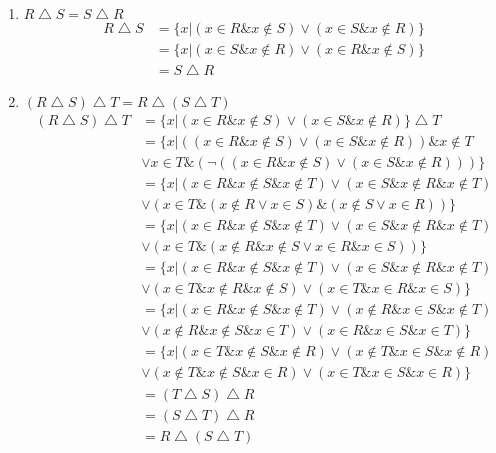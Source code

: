 \documentclass[12pt]{article}
\theoremstyle{neosn}
\begin{document}
    \begin{enumerate}
        \item $R \bigtriangleup S = S \bigtriangleup R$\\
            \begin{align*}
                R \bigtriangleup S &= \{x|(x\in R \& x \notin S) \lor (x\in S \& x\notin R)\}\\
                                    &= \{x|(x\in S \& x\notin R) \lor (x\in R \& x \notin S)\}\\
                                    & = S \bigtriangleup R
            \end{align*}

        \item $(R \bigtriangleup S) \bigtriangleup T = R \bigtriangleup (S \bigtriangleup T)$\\
            \begin{align*}
                (R \bigtriangleup S) \bigtriangleup T &= \{x|(x\in R \& x \notin S) \lor (x\in S \& x\notin R)\} \bigtriangleup T\\
                    &= \{x|((x\in R \& x \notin S) \lor (x\in S \& x\notin R)) \& x \notin T \\
                    &\lor x \in T \& (\lnot ((x\in R \& x \notin S) \lor (x\in S \& x\notin R))) \}\\
                    &= \{x|(x\in R \& x \notin S \& x\notin T) \lor (x\in S \& x\notin R \& x\notin T)\\
                    &\lor(x\in T \& (x\notin R \lor x\in S)\& (x\notin S \lor x\in R ))\}\\
                    &= \{x|(x\in R \& x \notin S \& x\notin T) \lor (x\in S \& x\notin R \& x\notin T)\\
                    & \lor (x\in T \& (x\notin R \& x\notin S \lor x\in R \& x\in S))\}\\
                    &= \{x|(x\in R \& x \notin S \& x\notin T) \lor (x\in S \& x\notin R \& x\notin T)\\
                    & \lor (x\in T \& x\notin R \& x\notin S) \lor (x\in T \& x\in R \& x\in S)\}\\
                    &= \{x|(x\in R \& x \notin S \& x\notin T) \lor (x\notin R \& x\in S \& x\notin T)\\
                    & \lor (x\notin R \& x\notin S \& x\in T) \lor (x\in R \& x\in S \& x\in T)\}\\
                    &= \{x|(x\in T \& x \notin S \& x\notin R) \lor (x\notin T \& x\in S \& x\notin R)\\
                    & \lor (x\notin T \& x\notin S \& x\in R) \lor (x\in T \& x\in S \& x\in R)\}\\
                    &= (T \bigtriangleup S) \bigtriangleup R\\
                    &= (S \bigtriangleup T) \bigtriangleup R\\
                    &= R \bigtriangleup (S \bigtriangleup T)
            \end{align*}


\end{enumerate}
\end{document}
